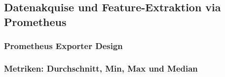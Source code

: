 \subsection{Datenakquise und Feature-Extraktion via Prometheus}
        \subsubsection{Prometheus Exporter Design}
        \subsubsection{Metriken: Durchschnitt, Min, Max und Median}